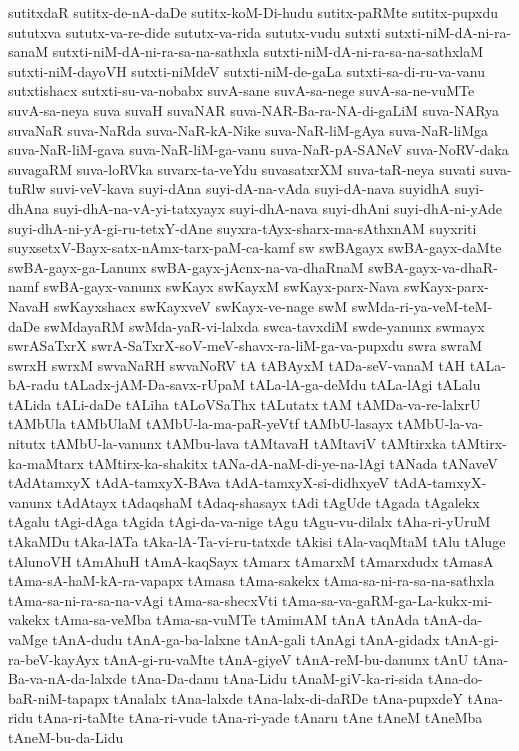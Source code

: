 {sutitxdaR
sutitx-de-nA-daDe
sutitx-koM-Di-hudu
sutitx-paRMte
sutitx-pupxdu
sututxva
sututx-va-re-dide
sututx-va-rida
sututx-vudu
sutxti
sutxti-niM-dA-ni-ra-sanaM
sutxti-niM-dA-ni-ra-sa-na-sathxla
sutxti-niM-dA-ni-ra-sa-na-sathxlaM
sutxti-niM-dayoVH
sutxti-niMdeV
sutxti-niM-de-gaLa
sutxti-sa-di-ru-va-vanu
sutxtishacx
sutxti-su-va-nobabx
suvA-sane
suvA-sa-nege
suvA-sa-ne-vuMTe
suvA-sa-neya
suva
suvaH
suvaNAR
suva-NAR-Ba-ra-NA-di-gaLiM
suva-NARya
suvaNaR
suva-NaRda
suva-NaR-kA-Nike
suva-NaR-liM-gAya
suva-NaR-liMga
suva-NaR-liM-gava
suva-NaR-liM-ga-vanu
suva-NaR-pA-SANeV
suva-NoRV-daka
suvagaRM
suva-loRVka
suvarx-ta-veYdu
suvasatxrXM
suva-taR-neya
suvati
suva-tuRlw
suvi-veV-kava
suyi-dAna
suyi-dA-na-vAda
suyi-dA-nava
suyidhA
suyi-dhAna
suyi-dhA-na-vA-yi-tatxyayx
suyi-dhA-nava
suyi-dhAni
suyi-dhA-ni-yAde
suyi-dhA-ni-yA-gi-ru-tetxY-dAne
suyxra-tAyx-sharx-ma-sAthxnAM
suyxriti
suyxsetxV-Bayx-satx-nAmx-tarx-paM-ca-kamf
sw
swBAgayx
swBA-gayx-daMte
swBA-gayx-ga-Lanunx
swBA-gayx-jAcnx-na-va-dhaRnaM
swBA-gayx-va-dhaR-namf
swBA-gayx-vanunx
swKayx
swKayxM
swKayx-parx-Nava
swKayx-parx-NavaH
swKayxshacx
swKayxveV
swKayx-ve-nage
swM
swMda-ri-ya-veM-teM-daDe
swMdayaRM
swMda-yaR-vi-lalxda
swca-tavxdiM
swde-yanunx
swmayx
swrASaTxrX
swrA-SaTxrX-soV-meV-shavx-ra-liM-ga-va-pupxdu
swra
swraM
swrxH
swrxM
swvaNaRH
swvaNoRV
tA
tABAyxM
tADa-seV-vanaM
tAH
tALa-bA-radu
tALadx-jAM-Da-savx-rUpaM
tALa-lA-ga-deMdu
tALa-lAgi
tALalu
tALida
tALi-daDe
tALiha
tALoVSaThx
tALutatx
tAM
tAMDa-va-re-lalxrU
tAMbUla
tAMbUlaM
tAMbU-la-ma-paR-yeVtf
tAMbU-lasayx
tAMbU-la-va-nitutx
tAMbU-la-vanunx
tAMbu-lava
tAMtavaH
tAMtaviV
tAMtirxka
tAMtirx-ka-maMtarx
tAMtirx-ka-shakitx
tANa-dA-naM-di-ye-na-lAgi
tANada
tANaveV
tAdAtamxyX
tAdA-tamxyX-BAva
tAdA-tamxyX-si-didhxyeV
tAdA-tamxyX-vanunx
tAdAtayx
tAdaqshaM
tAdaq-shasayx
tAdi
tAgUde
tAgada
tAgalekx
tAgalu
tAgi-dAga
tAgida
tAgi-da-va-nige
tAgu
tAgu-vu-dilalx
tAha-ri-yUruM
tAkaMDu
tAka-lATa
tAka-lA-Ta-vi-ru-tatxde
tAkisi
tAla-vaqMtaM
tAlu
tAluge
tAlunoVH
tAmAhuH
tAmA-kaqSayx
tAmarx
tAmarxM
tAmarxdudx
tAmasA
tAma-sA-haM-kA-ra-vapapx
tAmasa
tAma-sakekx
tAma-sa-ni-ra-sa-na-sathxla
tAma-sa-ni-ra-sa-na-vAgi
tAma-sa-shecxVti
tAma-sa-va-gaRM-ga-La-kukx-mi-vakekx
tAma-sa-veMba
tAma-sa-vuMTe
tAmimAM
tAnA
tAnAda
tAnA-da-vaMge
tAnA-dudu
tAnA-ga-ba-lalxne
tAnA-gali
tAnAgi
tAnA-gidadx
tAnA-gi-ra-beV-kayAyx
tAnA-gi-ru-vaMte
tAnA-giyeV
tAnA-reM-bu-danunx
tAnU
tAna-Ba-va-nA-da-lalxde
tAna-Da-danu
tAna-Lidu
tAnaM-giV-ka-ri-sida
tAna-do-baR-niM-tapapx
tAnalalx
tAna-lalxde
tAna-lalx-di-daRDe
tAna-pupxdeY
tAna-ridu
tAna-ri-taMte
tAna-ri-vude
tAna-ri-yade
tAnaru
tAne
tAneM
tAneMba
tAneM-bu-da-Lidu
}

